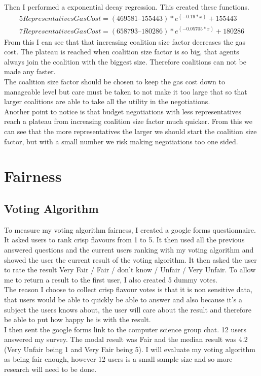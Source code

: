 Then I performed a exponential decay regression. This created these functions.
\begin{gather*}
5 Representatives Gas Cost = (469581 – 155443)*e^(-0.19*x) + 155443 \\
7 Representatives Gas Cost = (658793 – 180286)*e^(-0.05705*x) + 180286
\end{gather*}
From this I can see that that increasing coalition size factor decreases the gas cost. The plateau is reached when coalition size factor is so big, that agents always join the coalition with the biggest size. Therefore coalitions can not be made any faster. \\
The coalition size factor should be chosen to keep the gas cost down to manageable level but care must be taken to not make it too large that so that larger coalitions are able to take all the utility in the negotiations.\\
Another point to notice is that budget negotiations with less representatives reach a plateau from increasing coalition size factor much quicker.  From this we can see that the more representatives the larger we should start the coalition size factor, but with a small number we risk making negotiations too one sided.\\
\section{Fairness} 
\subsection{Voting Algorithm}
To measure my voting algorithm fairness, I created a google forms questionnaire. It asked users to rank crisp flavours from 1 to 5. It then used all the previous answered questions and the current users ranking with my voting algorithm and showed the user the current result of the voting algorithm. It then asked the user to rate the result Very Fair / Fair / don’t know / Unfair / Very Unfair. To allow me to return a result to the first user, I also created 5 dummy votes. \\
The reason I choose to collect crisp flavour votes is that it is non sensitive data, that users would be able to quickly be able to answer and also because it’s a subject the users knows about, the user will care about the result and therefore be able to put how happy he is with the result. \\
I then sent the google forms link to the computer science group chat. 12 users answered my survey. The modal result was Fair and the median result was 4.2 (Very Unfair being 1 and Very Fair being 5). I will evaluate my voting algorithm as being fair enough, however 12 users is a small sample size and so more research will need to be done.
